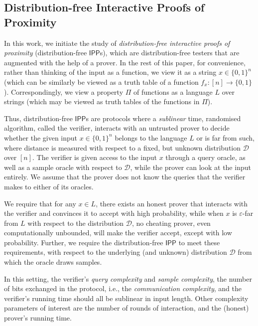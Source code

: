 \documentclass[11pt]{article}
\newcommand{\IPP}{\mathsf{IPP}}
\newcommand{\sD}{\mathcal{D}}
\begin{document}
\subsection{Distribution-free Interactive Proofs of Proximity}
\label{sec:dfipps_motivate}
In this work, we initiate the study of \textit{distribution-free interactive proofs of proximity} (distribution-free $\IPP$s), which are distribution-free testers that are augmented with the help of a prover. In the rest of this paper, for convenience, rather than thinking of the input as a function, we view it as a string $x \in \{0,1\}^{n}$ (which can be similarly be viewed as a truth table of a function $f_x : [n] \to \{0,1\}$). Correspondingly, we view a property $\Pi$ of functions as a language $L$ over strings (which may be viewed as truth tables of the functions in $\Pi$).

Thus, distribution-free $\IPP$s are protocols where a \textit{sublinear} time, randomised algorithm, called the verifier, interacts with an untrusted prover to decide whether the given input $x \in \{0,1\}^n$ belongs to the language $L$ or is far from such, where distance is measured with respect to a fixed, but unknown distribution $\sD$ over $[n]$. The verifier is given access to the input $x$ through a query oracle, as well as a sample oracle with respect to $\sD$, while the prover can look at the input entirely. We assume that the prover does not know the queries that the verifier makes to either of its oracles.

We require that for any $x \in L$, there exists an honest prover that interacts with the verifier and convinces it to accept with high probability,
while when $x$ is $\varepsilon$-far from $L$ with respect to the distribution $\sD$, no cheating prover, even computationally unbounded, will make the verifier accept, except with low probability.
Further, we require the distribution-free $\IPP$ to meet these requirements, with respect to the underlying (and unknown) distribution $\sD$ from which the oracle draws samples.

In this setting, the verifier's \textit{query complexity} and \textit{sample complexity}, the number of bits exchanged in the protocol, i.e., the \textit{communication complexity}, and the verifier's running time should all be sublinear in input length. Other complexity parameters of interest are the number of rounds of interaction, and the (honest) prover's running time.
\end{document}
